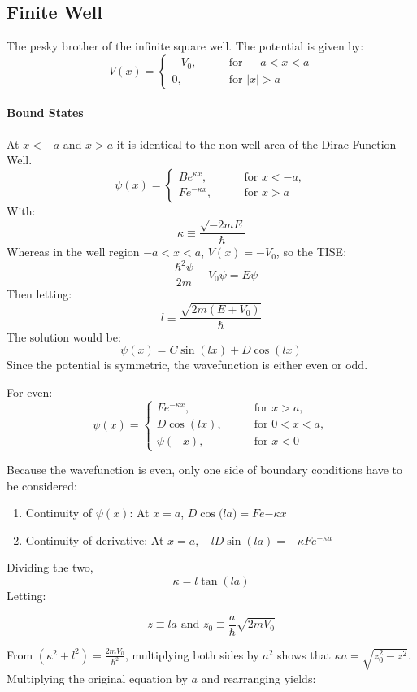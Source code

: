 \documentclass[12pt]{article}
\begin{document}
\subsection{Finite Well}

The pesky brother of the infinite square well. The potential is given by:
\[
V(x) = 
\left.
\begin{cases}
-V_0, \qquad & \text{for } -a < x < a\\
0, \qquad & \text{for } |x| > a
\end{cases}
\right.
\]

\paragraph{Bound States}
At $x<-a$ and $x>a$ it is identical to the non well area of the Dirac Function Well. 
\[
\psi(x) = 
\begin{cases}
Be^{\kappa x}, \qquad & \text{for } x<-a,\\
Fe^{-\kappa x}, \qquad & \text{for } x> a
\end{cases}
\]
With: \[\kappa \equiv \frac{\sqrt{-2mE}}{\hbar} \]
Whereas in the well region $-a<x<a$, $V(x)=-V_0$, so the TISE:
\[-\frac{\hbar^2\psi}{2m}-V_0\psi=E\psi\]
Then letting:
\[l \equiv \frac{\sqrt{2m(E+V_0)}}{\hbar}\]
The solution would be:
\[\psi(x) = C\sin{(lx)} + D\cos{(lx)}\]
Since the potential is symmetric, the wavefunction is either even or odd. 

For even:
\[
\psi(x) = 
\left.
\begin{cases}
Fe^{-\kappa x}, \qquad& \text{for } x> a,\\
D\cos{(lx)}, \qquad& \text{for } 0 < x <a,\\
\psi(-x), \qquad& \text{for } x < 0
\end{cases}
\right.
\]

Because the wavefunction is even, only one side of boundary conditions have to be considered:

\begin{enumerate}
    \item Continuity of $\psi(x)$: At $x=a$, \(D\cos{(la}) = Fe{-\kappa x}\)
    \item Continuity of derivative: At $x=a$, \(-lD\sin{(la)} = -\kappa Fe^{-\kappa a}\)
\end{enumerate}
Dividing the two, \[\kappa = l\tan{(la)}\]
Letting:

\[
z \equiv la  \text{ and } z_0 \equiv  \frac{a}{\hbar}\sqrt{2mV_0}
\]

From $(\kappa^2 + l^2) = \frac{2mV_0}{\hbar^2}$, multiplying both sides by $a^2$ shows that $\kappa a = \sqrt{z_0^2 - z^2}$. Multiplying the original equation by $a$ and rearranging yields:
\end{document}
